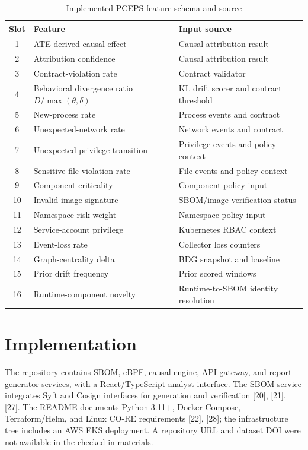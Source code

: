 \documentclass[conference]{IEEEtran}
\begin{document}
\begin{table}[t]\caption{Implemented PCEPS feature schema and source}\label{tab:pceps}\centering\scriptsize\begin{tabularx}{\columnwidth}{cXX}\toprule Slot & Feature & Input source\\\midrule
1 & ATE-derived causal effect & Causal attribution result\\
2 & Attribution confidence & Causal attribution result\\
3 & Contract-violation rate & Contract validator\\
4 & Behavioral divergence ratio $D/\max(\theta,\delta)$ & KL drift scorer and contract threshold\\
5 & New-process rate & Process events and contract\\
6 & Unexpected-network rate & Network events and contract\\
7 & Unexpected privilege transition & Privilege events and policy context\\
8 & Sensitive-file violation rate & File events and policy context\\
9 & Component criticality & Component policy input\\
10 & Invalid image signature & SBOM/image verification status\\
11 & Namespace risk weight & Namespace policy input\\
12 & Service-account privilege & Kubernetes RBAC context\\
13 & Event-loss rate & Collector loss counters\\
14 & Graph-centrality delta & BDG snapshot and baseline\\
15 & Prior drift frequency & Prior scored windows\\
16 & Runtime-component novelty & Runtime-to-SBOM identity resolution\\\bottomrule\end{tabularx}\end{table}

\section{Implementation}
The repository contains SBOM, eBPF, causal-engine, API-gateway, and report-generator services, with a React/TypeScript analyst interface. The SBOM service integrates Syft and Cosign interfaces for generation and verification [20], [21], [27]. The README documents Python 3.11+, Docker Compose, Terraform/Helm, and Linux CO-RE requirements [22], [28]; the infrastructure tree includes an AWS EKS deployment. A repository URL and dataset DOI were not available in the checked-in materials.
\end{document}
